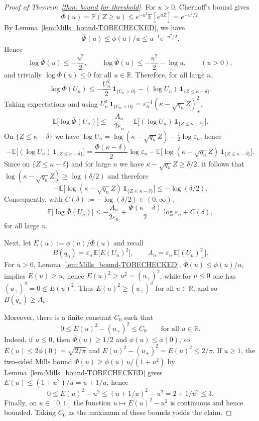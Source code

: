 \documentclass[11pt]{article}
\begin{document}
\begin{proof}[Proof of Theorem~\ref{thm: bound for threshold}]
For $u>0$, Chernoff's bound gives $$\overline{\Phi}(u)=\mathbb P(Z\geq u)\leq e^{-u^2}\mathbb E[e^{u Z}]= e^{-u^2/2}.$$ By Lemma~\ref{lem:Mills_bound-TOBECHECKED}, we have 
\begin{equation*}
 \begin{split}
 \overline{\Phi}(u)\le \phi(u)/u\le u^{-1}e^{-u^2/2}.
\end{split}
\end{equation*}
 Hence
\[
\log\overline{\Phi}(u)\le -\frac{u^2}{2},
\qquad
\log\overline{\Phi}(u)\le -\frac{u^2}{2}-\log u,
\qquad (u>0),
\]
and trivially $\log\overline{\Phi}(u)\le 0$ for all $u\in\mathbb R$.
Therefore, for all large $n$,
\[
\log\overline{\Phi}(U_n)
\le
-\frac{U_n^2}{2}\,\mathbf{1}_{\{U_n>0\}}
-(\log U_n)\,\mathbf{1}_{\{Z\le \kappa-\delta\}}.
\]
Taking expectations and using $U_n^2\,\mathbf{1}_{\{U_n>0\}}=\varepsilon_n^{-1}(\kappa-\sqrt{q_n}Z)_+^2$,
\[
\mathbb E\big[\log\overline{\Phi}(U_n)\big]
\le
-\frac{A_n}{2\varepsilon_n}
-\mathbb E\big[(\log U_n)\,\mathbf{1}_{\{Z\le \kappa-\delta\}}\big].
\]
On $\{Z\le \kappa-\delta\}$ we have $\log U_n=\log(\kappa-\sqrt{q_n}Z)-\frac12\log\varepsilon_n$, hence
\[
-\mathbb E\big[(\log U_n)\,\mathbf{1}_{\{Z\le \kappa-\delta\}}\big]
=
\frac{\Phi(\kappa-\delta)}{2}\log\varepsilon_n
-\mathbb E\big[\log(\kappa-\sqrt{q_n}Z)\,\mathbf{1}_{\{Z\le \kappa-\delta\}}\big].
\]
Since on $\{Z\le \kappa-\delta\}$ and for large $n$ we have $\kappa-\sqrt{q_n}Z\ge \delta/2$, it follows that
$\log(\kappa-\sqrt{q_n}Z)\ge \log(\delta/2)$ and therefore
\[
-\mathbb E\big[\log(\kappa-\sqrt{q_n}Z)\,\mathbf{1}_{\{Z\le \kappa-\delta\}}\big]\le -\log(\delta/2).
\]
Consequently, with $C(\delta):=-\log(\delta/2)\in(0,\infty)$,
\begin{equation}\label{eq:constraint_bd_unif_nostep_revised-TOBECHECKED}
\mathbb E\big[\log\overline{\Phi}(U_n)\big]
\le
-\frac{A_n}{2\varepsilon_n}
+\frac{\Phi(\kappa-\delta)}{2}\log\varepsilon_n
+C(\delta),
\end{equation}
for all large $n$.

Next, let $E(u):=\phi(u)/\overline{\Phi}(u)$ and recall 
\[
B(q_n)=\varepsilon_n\,\mathbb E\big[E(U_n)^2\big],
\qquad
A_n=\varepsilon_n\,\mathbb E\big[(U_n)_+^2\big].
\]
For $u>0$,  Lemma~\ref{lem:Mills_bound-TOBECHECKED}, $\overline{\Phi}(u)\le \phi(u)/u$, implies $E(u)\ge u$, hence
$E(u)^2\ge u^2=(u_+)^2$, while for $u\le 0$ one has $(u_+)^2=0\le E(u)^2$. Thus
$E(u)^2\ge (u_+)^2$ for all $u\in\mathbb R$, and so $B(q_n)\ge A_n$.

Moreover, there is a finite constant $C_0$ such that
\[
0\le E(u)^2-(u_+)^2\le C_0\qquad\text{for all }u\in\mathbb R.
\]
Indeed, if $u\le 0$, then $\overline{\Phi}(u)\ge 1/2$ and $\phi(u)\le \phi(0)$, so
$E(u)\le 2\phi(0)=\sqrt{2/\pi}$ and $E(u)^2-(u_+)^2=E(u)^2\le 2/\pi$.
If $u\ge 1$, the two-sided Mills bound $\overline{\Phi}(u)\ge \phi(u)\,u/(1+u^2)$ by Lemma~\ref{lem:Mills_bound-TOBECHECKED} gives
$E(u)\le (1+u^2)/u=u+1/u$, hence
\[
0\le E(u)^2-u^2\le (u+1/u)^2-u^2=2+1/u^2\le 3.
\]
Finally, on $u\in[0,1]$ the function $u\mapsto E(u)^2-u^2$ is continuous and hence bounded.
Taking $C_0$ as the maximum of these bounds yields the claim.


\end{proof}
\end{document}
